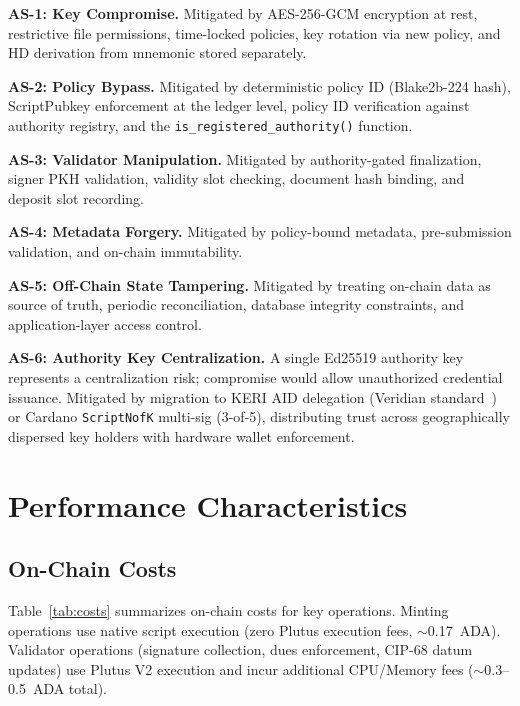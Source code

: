 \documentclass[conference,10pt]{IEEEtran}
\begin{document}
\textbf{AS-1: Key Compromise.} Mitigated by AES-256-GCM encryption at rest, restrictive file permissions, time-locked policies, key rotation via new policy, and HD derivation from mnemonic stored separately.

\textbf{AS-2: Policy Bypass.} Mitigated by deterministic policy ID (Blake2b-224 hash), ScriptPubkey enforcement at the ledger level, policy ID verification against authority registry, and the \texttt{is\_registered\_authority()} function.

\textbf{AS-3: Validator Manipulation.} Mitigated by authority-gated finalization, signer PKH validation, validity slot checking, document hash binding, and deposit slot recording.

\textbf{AS-4: Metadata Forgery.} Mitigated by policy-bound metadata, pre-submission validation, and on-chain immutability.

\textbf{AS-5: Off-Chain State Tampering.} Mitigated by treating on-chain data as source of truth, periodic reconciliation, database integrity constraints, and application-layer access control.

\textbf{AS-6: Authority Key Centralization.} A single Ed25519 authority key represents a centralization risk; compromise would allow unauthorized credential issuance. Mitigated by migration to KERI AID delegation (Veridian standard~\cite{veridian2025}) or Cardano \texttt{ScriptNofK} multi-sig (3-of-5), distributing trust across geographically dispersed key holders with hardware wallet enforcement.

\section{Performance Characteristics}
\label{sec:performance}

\subsection{On-Chain Costs}

Table~\ref{tab:costs} summarizes on-chain costs for key operations. Minting operations use native script execution (zero Plutus execution fees, ${\sim}$0.17~ADA). Validator operations (signature collection, dues enforcement, CIP-68 datum updates) use Plutus V2 execution and incur additional CPU/Memory fees (${\sim}$0.3--0.5~ADA total).
\end{document}

